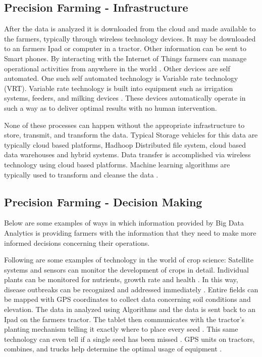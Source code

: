 \documentclass[sigconf]{acmart}
\begin{document}
\subsection{Precision Farming - Infrastructure}

After the data is analyzed it is downloaded from the cloud and made available to the farmers, typically through wireless technology devices. It may be downloaded to an farmers Ipad or computer in a tractor.  Other information can be sent to Smart phones. By interacting with the Internet of Things farmers can manage operational activities from anywhere in the world \cite{Wolfert}.  Other devices are self automated. One such self automated technology is Variable rate technology (VRT). Variable rate technology is built into equipment such as irrigation systems, feeders, and milking devices \cite{www-google-Wikipedia}. These devices automatically operate in such a way as to deliver optimal results with no human intervention. 

None of these processes can happen without the appropriate infrastructure to store, transmit, and transform the data. Typical Storage vehicles for this data are typically cloud based platforms, Hadhoop Distributed file system, cloud based data warehouses and hybrid systems.  Data transfer is accomplished via wireless technology using cloud based platforms. Machine learning algorithms are typically used to transform and cleanse the data \cite{Wolfert}.

\subsection {Precision Farming - Decision Making}

Below are some examples of ways in which information provided by Big Data Analytics is providing farmers with the information that they need to make more informed decisions concerning their operations.

Following are some examples of technology in the world of crop science: Satellite systems and sensors can monitor the development of crops in detail. Individual plants can be monitored for nutrients, growth rate and health \cite{www-google-bigdatatech}. In this way,  disease outbreaks can be recognized and addressed immediately \cite{www-google-Crop}.  Entire fields can be mapped with GPS coordinates to collect data concerning soil conditions and elevation. The data in analyzed using Algorithms and the data is sent back to an Ipad on the farmers tractor. The tablet then communicates with the tractor's planting mechanism telling it exactly where to place every seed \cite{www-google-Crop}. This same technology can even tell if a single seed has been missed \cite{www-google-Farm}. GPS units on tractors, combines, and trucks help determine the optimal usage of equipment \cite{www-google-bigdatatech}.
\end{document}
